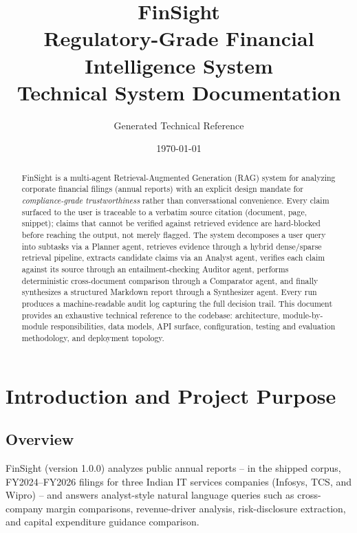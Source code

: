 \documentclass[11pt,a4paper]{report}
\title{
    \vspace{-2cm}
    {\Huge\bfseries FinSight}\\[0.3cm]
    {\Large Regulatory-Grade Financial Intelligence System}\\[0.2cm]
    {\large Technical System Documentation}
}
\author{Generated Technical Reference}
\date{\today}
\begin{document}
\maketitle
\thispagestyle{empty}

\begin{abstract}
\noindent
FinSight is a multi-agent Retrieval-Augmented Generation (RAG) system for analyzing
corporate financial filings (annual reports) with an explicit design mandate for
\emph{compliance-grade trustworthiness} rather than conversational convenience. Every
claim surfaced to the user is traceable to a verbatim source citation (document, page,
snippet); claims that cannot be verified against retrieved evidence are hard-blocked
before reaching the output, not merely flagged. The system decomposes a user query into
subtasks via a Planner agent, retrieves evidence through a hybrid dense/sparse
retrieval pipeline, extracts candidate claims via an Analyst agent, verifies each claim
against its source through an entailment-checking Auditor agent, performs deterministic
cross-document comparison through a Comparator agent, and finally synthesizes a
structured Markdown report through a Synthesizer agent. Every run produces a
machine-readable audit log capturing the full decision trail. This document provides an
exhaustive technical reference to the codebase: architecture, module-by-module
responsibilities, data models, API surface, configuration, testing and evaluation
methodology, and deployment topology.
\end{abstract}

\tableofcontents
\listoffigures
\listoftables

\chapter{Introduction and Project Purpose}

\section{Overview}

FinSight (version 1.0.0) analyzes public annual reports -- in the shipped corpus,
FY2024--FY2026 filings for three Indian IT services companies (Infosys, TCS, and
Wipro) -- and answers analyst-style natural language queries such as cross-company
margin comparisons, revenue-driver analysis, risk-disclosure extraction, and capital
expenditure guidance comparison.
\end{document}

